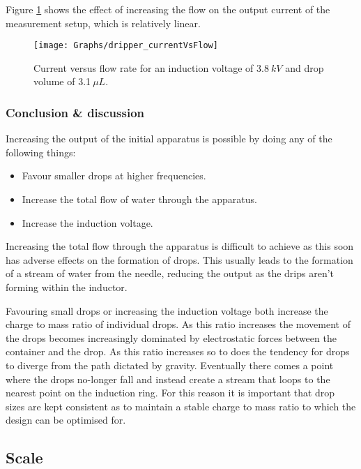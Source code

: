 Figure \ref{Figure_Graph_dripper_currentVsFlow} shows the effect
of increasing the flow on the output current of the measurement setup,
which is relatively linear.

\begin{figure}
\begin{centering}
\texttt{[image: Graphs/dripper\_currentVsFlow]}
\par\end{centering}

\protect\caption{\label{Figure_Graph_dripper_currentVsFlow}Current versus flow rate
for an induction voltage of 3.8$\: kV$ and drop volume of 3.1$\:\mu L$.}
\end{figure}



\subsubsection{Conclusion \& discussion}

Increasing the output of the initial apparatus is possible by doing
any of the following things:
\begin{itemize}
\item Favour smaller drops at higher frequencies.
\item Increase the total flow of water through the apparatus.
\item Increase the induction voltage.
\end{itemize}
Increasing the total flow through the apparatus is difficult to achieve
as this soon has adverse effects on the formation of drops. This usually
leads to the formation of a stream of water from the needle, reducing
the output as the drips aren't forming within the inductor.

Favouring small drops or increasing the induction voltage both increase
the charge to mass ratio of individual drops. As this ratio increases
the movement of the drops becomes increasingly dominated by electrostatic
forces between the container and the drop. As this ratio increases
so to does the tendency for drops to diverge from the path dictated
by gravity. Eventually there comes a point where the drops no-longer
fall and instead create a stream that loops to the nearest point on
the induction ring. For this reason it is important that drop sizes
are kept consistent as to maintain a stable charge to mass ratio to
which the design can be optimised for.


\subsection{Scale}


